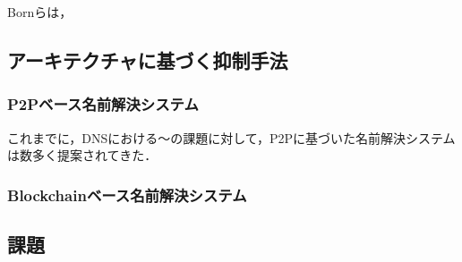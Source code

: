 Bornら\cite{born}は，

\subsection{アーキテクチャに基づく抑制手法}
\subsubsection{P2Pベース名前解決システム}
これまでに，DNSにおける〜の課題に対して，P2Pに基づいた名前解決システムは数多く提案されてきた．
\subsubsection{Blockchainベース名前解決システム}
\subsection{課題}
